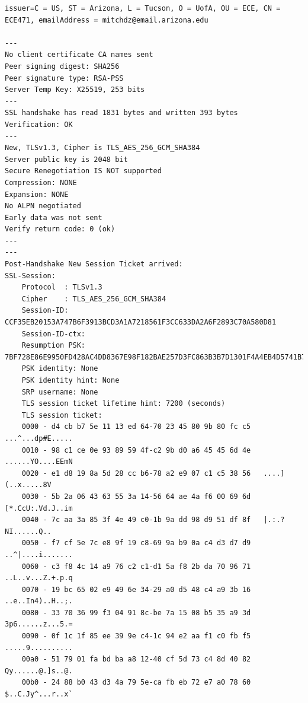 \documentclass[12pt]{article}
\begin{document}
\begin{lstlisting}
issuer=C = US, ST = Arizona, L = Tucson, O = UofA, OU = ECE, CN = ECE471, emailAddress = mitchdz@email.arizona.edu

---
No client certificate CA names sent
Peer signing digest: SHA256
Peer signature type: RSA-PSS
Server Temp Key: X25519, 253 bits
---
SSL handshake has read 1831 bytes and written 393 bytes
Verification: OK
---
New, TLSv1.3, Cipher is TLS_AES_256_GCM_SHA384
Server public key is 2048 bit
Secure Renegotiation IS NOT supported
Compression: NONE
Expansion: NONE
No ALPN negotiated
Early data was not sent
Verify return code: 0 (ok)
---
---
Post-Handshake New Session Ticket arrived:
SSL-Session:
    Protocol  : TLSv1.3
    Cipher    : TLS_AES_256_GCM_SHA384
    Session-ID: CCF35EB20153A747B6F3913BCD3A1A7218561F3CC633DA2A6F2893C70A580D81
    Session-ID-ctx: 
    Resumption PSK: 7BF728E86E9950FD428AC4DD8367E98F182BAE257D3FC863B3B7D1301F4A4EB4D5741B771D6F1B39DF9363FB75A482F1
    PSK identity: None
    PSK identity hint: None
    SRP username: None
    TLS session ticket lifetime hint: 7200 (seconds)
    TLS session ticket:
    0000 - d4 cb b7 5e 11 13 ed 64-70 23 45 80 9b 80 fc c5   ...^...dp#E.....
    0010 - 98 c1 ce 0e 93 89 59 4f-c2 9b d0 a6 45 45 6d 4e   ......YO....EEmN
    0020 - e1 d8 19 8a 5d 28 cc b6-78 a2 e9 07 c1 c5 38 56   ....](..x.....8V
    0030 - 5b 2a 06 43 63 55 3a 14-56 64 ae 4a f6 00 69 6d   [*.CcU:.Vd.J..im
    0040 - 7c aa 3a 85 3f 4e 49 c0-1b 9a dd 98 d9 51 df 8f   |.:.?NI......Q..
    0050 - f7 cf 5e 7c e8 9f 19 c8-69 9a b9 0a c4 d3 d7 d9   ..^|....i.......
    0060 - c3 f8 4c 14 a9 76 c2 c1-d1 5a f8 2b da 70 96 71   ..L..v...Z.+.p.q
    0070 - 19 bc 65 02 e9 49 6e 34-29 a0 d5 48 c4 a9 3b 16   ..e..In4)..H..;.
    0080 - 33 70 36 99 f3 04 91 8c-be 7a 15 08 b5 35 a9 3d   3p6......z...5.=
    0090 - 0f 1c 1f 85 ee 39 9e c4-1c 94 e2 aa f1 c0 fb f5   .....9..........
    00a0 - 51 79 01 fa bd ba a8 12-40 cf 5d 73 c4 8d 40 82   Qy......@.]s..@.
    00b0 - 24 88 b0 43 d3 4a 79 5e-ca fb eb 72 e7 a0 78 60   $..C.Jy^...r..x`


\end{lstlisting}
\end{document}
